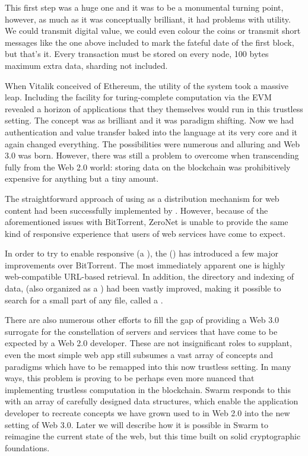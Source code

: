 This first step was a huge one and it was to be a monumental turning point, however, as much as it was conceptually brilliant, it had problems with utility. We could transmit digital value, we could even colour the coins or transmit short messages like the one above included to mark the fateful date of the first block, but that's it. Every transaction must be stored on every node, 100 bytes maximum extra data, sharding not included.

When Vitalik conceived of Ethereum, the utility of the system took a massive leap. Including the facility for turing-complete computation via the EVM revealed a horizon of applications that they themselves would run in this trustless setting. The concept was as brilliant and it was paradigm shifting. Now we had authentication and value transfer baked into the language at its very core and it again changed everything. The possibilities were numerous and alluring and Web 3.0 was born. However, there was still a problem to overcome when transcending fully from the Web 2.0 world: storing data on the blockchain was prohibitively expensive for anything but a tiny amount.

The straightforward approach of using  as a distribution mechanism for web content had been successfully implemented by  \cite{zeronet}. However, because of the aforementioned issues with BitTorrent, ZeroNet is unable to provide the same kind of responsive experience that users of web services have come to expect. 

In order to try to enable responsive  (a ), the  () \cite{ipfs2014} has introduced a few major improvements over BitTorrent. The most immediately apparent one is highly web-compatible URL-based retrieval. In addition, the directory and indexing of data, (also organized as a ) had been vastly improved, making it possible to search for a small part of any file, called a .

There are also numerous other efforts to fill the gap of providing a Web 3.0 surrogate for the constellation of servers and services that have come to be expected by a Web 2.0 developer. These are not insignificant roles to supplant, even the most simple web app still subsumes a vast array of concepts and paradigms which have to be remapped into this now trustless setting. In many ways, this problem is proving to be perhaps even more nuanced that implementing trustless computation in the blockchain. Swarm responds to this with an array of carefully designed data structures, which enable the application developer to recreate concepts we have grown used to in Web 2.0 into the new setting of Web 3.0. Later we will describe how it is possible in Swarm to reimagine the current state of the web, but this time built on solid cryptographic foundations.

